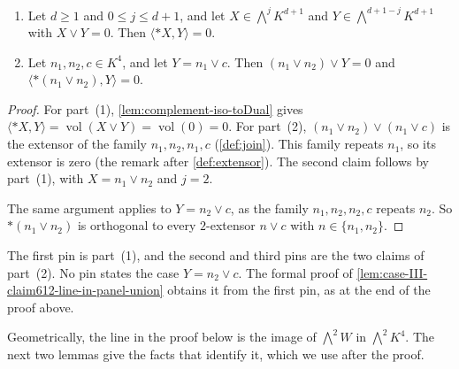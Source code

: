 \begin{lemma}
  \label{lem:complement-iso-decomposable-wedge-perp}
  \leanok
  \begin{enumerate}
    \item Let $d \ge 1$ and $0 \le j \le d+1$, and let
      $X \in \bigwedge^{j} K^{d+1}$ and $Y \in \bigwedge^{d+1-j} K^{d+1}$
      with $X \vee Y = 0$. Then $\langle *X, Y \rangle = 0$.
    \item Let $n_1, n_2, c \in K^4$, and let $Y = n_1 \vee c$. Then
      $(n_1 \vee n_2) \vee Y = 0$ and
      $\langle *(n_1 \vee n_2), Y \rangle = 0$.
  \end{enumerate}
\end{lemma}
\begin{proof}
  \leanok
  For part~(1), \cref{lem:complement-iso-toDual} gives
  $\langle *X, Y \rangle = \operatorname{vol}(X \vee Y) =
  \operatorname{vol}(0) = 0$. For part~(2),
  $(n_1 \vee n_2) \vee (n_1 \vee c)$ is the extensor of the family
  $n_1, n_2, n_1, c$ (\cref{def:join}). This family repeats $n_1$, so
  its extensor is zero (the remark after \cref{def:extensor}). The
  second claim follows by part~(1), with $X = n_1 \vee n_2$ and $j = 2$.

  The same argument applies to $Y = n_2 \vee c$, as the family
  $n_1, n_2, n_2, c$ repeats $n_2$. So $*(n_1 \vee n_2)$ is orthogonal
  to every $2$-extensor $n \vee c$ with $n \in \{n_1, n_2\}$.
\end{proof}
\begin{fmlnote}
  The first pin is part~(1), and the second and third pins are the two
  claims of part~(2). No pin states the case $Y = n_2 \vee c$. The
  formal proof of \cref{lem:case-III-claim612-line-in-panel-union}
  obtains it from the first pin, as at the end of the proof above.
\end{fmlnote}

Geometrically, the line in the proof below is the image of
$\bigwedge^2 W$ in $\bigwedge^2 K^4$. The next two lemmas give the facts
that identify it, which we use after the proof.

